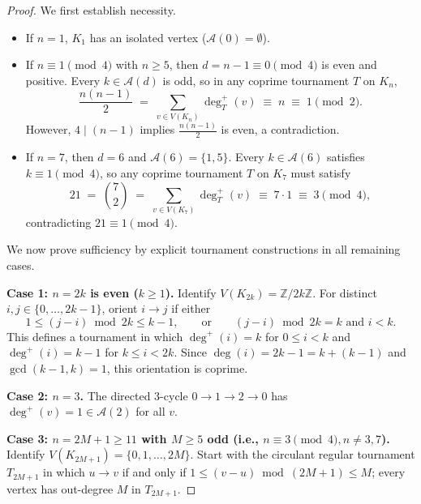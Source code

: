\documentclass[11pt,a4paper]{article}
\theoremstyle{definition}
\theoremstyle{remark}
\newcommand{\Z}{\mathbb{Z}}
\newcommand{\outdeg}{\deg^{+}}
\newcommand{\Aset}{\mathcal{A}}
\begin{document}
\begin{proof}
We first establish necessity.
\begin{itemize}[leftmargin=2em,itemsep=2pt]
  \item If $n = 1$, $K_1$ has an isolated vertex ($\Aset(0) = \emptyset$).
  \item If $n \equiv 1 \pmod{4}$ with $n \ge 5$, then $d = n - 1 \equiv 0 \pmod{4}$ is even and positive. Every $k \in \Aset(d)$ is odd, so in any coprime tournament $T$ on $K_n$,
  \[
    \frac{n(n-1)}{2} \;=\; \sum_{v \in V(K_n)} \outdeg_T(v) \;\equiv\; n \;\equiv\; 1 \pmod{2}.
  \]
  However, $4 \mid (n - 1)$ implies $\frac{n(n-1)}{2}$ is even, a contradiction.
  \item If $n = 7$, then $d = 6$ and $\Aset(6) = \{1, 5\}$. Every $k \in \Aset(6)$ satisfies $k \equiv 1 \pmod{4}$, so any coprime tournament $T$ on $K_7$ must satisfy
  \[
    21 \;=\; \binom{7}{2} \;=\; \sum_{v \in V(K_7)} \outdeg_T(v) \;\equiv\; 7 \cdot 1 \;\equiv\; 3 \pmod{4},
  \]
  contradicting $21 \equiv 1 \pmod{4}$.
\end{itemize}

We now prove sufficiency by explicit tournament constructions in all remaining cases.

\medskip\noindent\textbf{Case 1: $n = 2k$ is even ($k \ge 1$).}
Identify $V(K_{2k}) = \Z/2k\Z$. For distinct $i, j \in \{0, \dots, 2k - 1\}$, orient $i \to j$ if either
\[
  1 \le (j - i) \bmod 2k \le k - 1, \qquad\text{or}\qquad (j - i) \bmod 2k = k \text{ and } i < k.
\]
This defines a tournament in which $\outdeg(i) = k$ for $0 \le i < k$ and $\outdeg(i) = k - 1$ for $k \le i < 2k$. Since $\deg(i) = 2k - 1 = k + (k - 1)$ and $\gcd(k - 1, k) = 1$, this orientation is coprime.

\medskip\noindent\textbf{Case 2: $n = 3$.}
The directed $3$-cycle $0 \to 1 \to 2 \to 0$ has $\outdeg(v) = 1 \in \Aset(2)$ for all $v$.

\medskip\noindent\textbf{Case 3: $n = 2M + 1 \ge 11$ with $M \ge 5$ odd (i.e., $n \equiv 3 \pmod{4}, n \neq 3, 7$).}
Identify $V(K_{2M+1}) = \{0, 1, \dots, 2M\}$. Start with the circulant regular tournament $T_{2M+1}$ in which $u \to v$ if and only if $1 \le (v - u) \bmod (2M + 1) \le M$; every vertex has out-degree $M$ in $T_{2M+1}$.


\end{proof}
\end{document}
